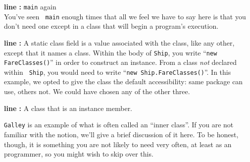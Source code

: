 \begin{description}
\item{\bf line :} {\tt main} again\\ You've seen {\tt
  main} enough times that all we feel we have to say here is that you don't
  need one except in a class that will begin a program's execution.

\item{\bf line :} A static class field is a value
  associated with the class, like any other, except that it names a class.
  Within the body of {\tt Ship}, you write ``{\tt new FareClasses()}'' in
  order to construct an instance. From a class {\em not} declared within {\tt
    Ship}, you would need to write ``{\tt new Ship.FareClasses()}''. In this
  example, we opted to give the class the default accessibility: same package
  can use, others not. We could have chosen any of the other three.

\item{\bf line :} A class that is an instance
  member.\\ 
\begin{finepoint} {\tt Galley} is an example of what is often called an
    ``inner class''. If you are not familiar with the notion, we'll give a
    brief discussion of it here. To be honest, though, it is something you are
    not likely to need very often, at least as an \Xten{} programmer, so you
    might wish to skip over this.



\end{finepoint}
\end{description}
